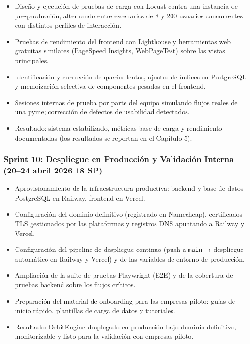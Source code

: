 \begin{itemize}
\tightlist
\item
  Diseño y ejecución de pruebas de carga con Locust contra una instancia de pre-producción, alternando entre escenarios de 8 y 200 usuarios concurrentes con distintos perfiles de interacción.
\item
  Pruebas de rendimiento del frontend con Lighthouse y herramientas web gratuitas similares (PageSpeed Insights, WebPageTest) sobre las vistas principales.
\item
  Identificación y corrección de queries lentas, ajustes de índices en PostgreSQL y memoización selectiva de componentes pesados en el frontend.
\item
  Sesiones internas de prueba por parte del equipo simulando flujos reales de una pyme; corrección de defectos de usabilidad detectados.
\item
  Resultado: sistema estabilizado, métricas base de carga y rendimiento documentadas (los resultados se reportan en el Capítulo 5).
\end{itemize}

\subsubsection{Sprint 10: Despliegue en Producción y Validación Interna (20--24 abril 2026 \textbar{} 18 SP)}\label{sprint-10-despliegue-en-producciuxf3n-y-validaciuxf3n-interna-2024-abril-2026-18-sp}

\begin{itemize}
\tightlist
\item
  Aprovisionamiento de la infraestructura productiva: backend y base de datos PostgreSQL en Railway, frontend en Vercel.
\item
  Configuración del dominio definitivo (registrado en Namecheap), certificados TLS gestionados por las plataformas y registros DNS apuntando a Railway y Vercel.
\item
  Configuración del pipeline de despliegue continuo (push a \texttt{main} → despliegue automático en Railway y Vercel) y de las variables de entorno de producción.
\item
  Ampliación de la suite de pruebas Playwright (E2E) y de la cobertura de pruebas backend sobre los flujos críticos.
\item
  Preparación del material de onboarding para las empresas piloto: guías de inicio rápido, plantillas de carga de datos y tutoriales.
\item
  Resultado: OrbitEngine desplegado en producción bajo dominio definitivo, monitorizable y listo para la validación con empresas piloto.
\end{itemize}

